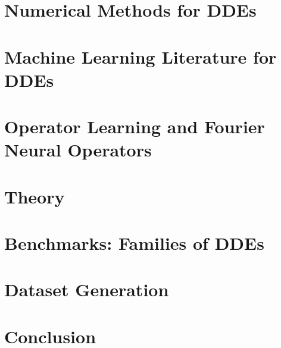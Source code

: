 \documentclass[11pt]{article}
\theoremstyle{plain}
\theoremstyle{definition}
\theoremstyle{remark}
\begin{document}
\section{Numerical Methods for DDEs}


\section{Machine Learning Literature for DDEs}


\section{Operator Learning and Fourier Neural Operators}


\section{Theory}
\label{sec:theory}


\section{Benchmarks: Families of DDEs}


\section{Dataset Generation}




\section{Conclusion}




\end{document}
